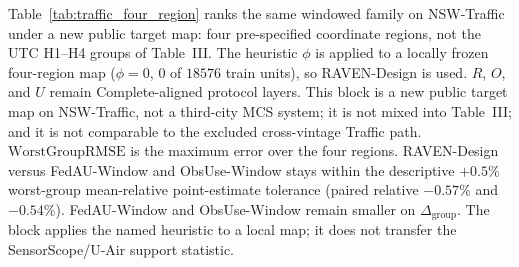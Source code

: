 Table~\ref{tab:traffic_four_region} ranks the same windowed family on
NSW-Traffic under a new public target map: four pre-specified coordinate
regions, not the UTC H1--H4 groups of Table~III.
The heuristic $\phi$ is applied to a locally frozen four-region map
($\phi=0$, $0$ of $18576$ train units), so RAVEN-Design is used.
$R$, $O$, and $U$ remain Complete-aligned protocol layers.
This block is a new public target map on NSW-Traffic, not a third-city
MCS system; it is not mixed into Table~III;
and it is not comparable to the excluded cross-vintage Traffic path.
$\mathrm{WorstGroupRMSE}$ is the maximum error over the four regions.
RAVEN-Design versus FedAU-Window and ObsUse-Window stays within
the descriptive $+0.5\%$ worst-group mean-relative point-estimate
tolerance (paired relative $-0.57\%$ and $-0.54\%$).
FedAU-Window and ObsUse-Window remain smaller on $\Delta_{\mathrm{group}}$.
The block applies the named heuristic to a local map; it does not transfer
the SensorScope/U-Air support statistic.

